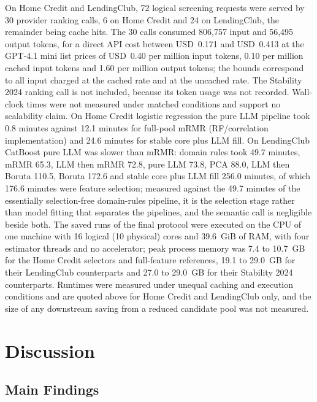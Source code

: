 \documentclass[final,5p,twocolumn]{elsarticle}
\begin{document}
On Home Credit and LendingClub, 72 logical screening requests were served by 30 provider ranking calls, 6 on Home Credit and 24 on LendingClub, the remainder being cache hits. The 30 calls consumed 806,757 input and 56,495 output tokens, for a direct API cost between USD~0.171 and USD~0.413 at the GPT-4.1 mini list prices of USD~0.40 per million input tokens, 0.10 per million cached input tokens and 1.60 per million output tokens; the bounds correspond to all input charged at the cached rate and at the uncached rate. The Stability 2024 ranking call is not included, because its token usage was not recorded. Wall-clock times were not measured under matched conditions and support no scalability claim. On Home Credit logistic regression the pure LLM pipeline took 0.8 minutes against 12.1 minutes for full-pool mRMR (RF/correlation implementation) and 24.6 minutes for stable core plus LLM fill. On LendingClub CatBoost pure LLM was slower than mRMR: domain rules took 49.7 minutes, mRMR 65.3, LLM then mRMR 72.8, pure LLM 73.8, PCA 88.0, LLM then Boruta 110.5, Boruta 172.6 and stable core plus LLM fill 256.0 minutes, of which 176.6 minutes were feature selection; measured against the 49.7 minutes of the essentially selection-free domain-rules pipeline, it is the selection stage rather than model fitting that separates the pipelines, and the semantic call is negligible beside both. The saved runs of the final protocol were executed on the CPU of one machine with 16 logical (10 physical) cores and 39.6~GiB of RAM, with four estimator threads and no accelerator; peak process memory was 7.4 to 10.7~GB for the Home Credit selectors and full-feature references, 19.1 to 29.0~GB for their LendingClub counterparts and 27.0 to 29.0~GB for their Stability 2024 counterparts. Runtimes were measured under unequal caching and execution conditions and are quoted above for Home Credit and LendingClub only, and the size of any downstream saving from a reduced candidate pool was not measured.




\section{Discussion}
\label{sec:discussion}

\subsection{Main Findings}
\label{subsec:main_findings}
\end{document}
